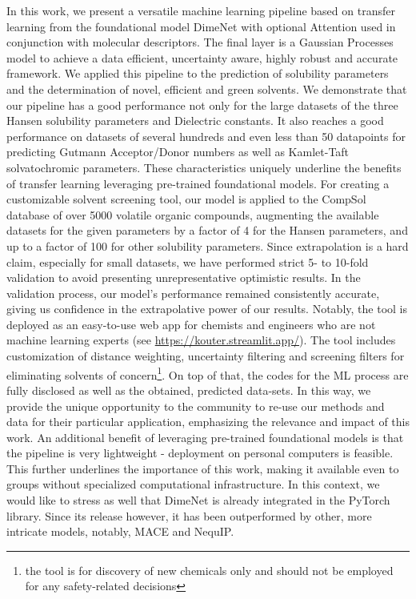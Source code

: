 \documentclass[
  english,        %
  font=times,     %
  onecolumn,      %
]{article}
\begin{document}
In this work, we present a versatile machine learning pipeline based on transfer learning from the foundational model DimeNet with optional Attention used in conjunction with molecular descriptors. The final layer is a Gaussian Processes model to achieve a data efficient, uncertainty aware, highly robust and accurate framework. We applied this pipeline to the prediction of solubility parameters and the determination of novel, efficient and green solvents. We demonstrate that our pipeline has a good performance not only for the large datasets of the three Hansen solubility parameters and Dielectric constants. It also reaches a good performance on datasets of several hundreds and even less than 50 datapoints for predicting Gutmann Acceptor/Donor numbers as well as Kamlet-Taft solvatochromic parameters. These characteristics uniquely underline the benefits  of transfer learning leveraging pre-trained foundational models. For creating a customizable solvent screening tool, our model is applied to the CompSol database of over 5000 volatile organic compounds, augmenting the available datasets for the given parameters by a factor of 4 for the Hansen parameters, and up to a factor of 100 for other solubility parameters. Since extrapolation is a hard claim, especially for small datasets, we have performed strict 5- to 10-fold validation to avoid presenting unrepresentative optimistic results. In the validation process, our model's performance remained consistently accurate, giving us confidence in the extrapolative power of our results.  Notably, the tool is deployed as an easy-to-use web app for chemists and engineers who are not machine learning experts (see \url{https://kouter.streamlit.app/}). The tool includes customization of distance weighting, uncertainty filtering and
screening filters for eliminating solvents of concern\footnote{the tool is for discovery of new chemicals only and should not be employed for any safety-related decisions}.  On top of that, the codes for the ML process are fully disclosed as well as the obtained, predicted data-sets. In this way, we provide the unique opportunity to the community to re-use our methods and data for their particular application, emphasizing the relevance and impact of this work. An additional benefit of leveraging pre-trained foundational models is that the pipeline is very lightweight - deployment on personal computers is feasible. This further underlines the importance of this work, making it available even to groups without specialized computational infrastructure. In this context, we would like to stress as well that DimeNet is already integrated in the PyTorch library. Since its release however, it has been outperformed by other, more intricate models, notably, MACE and NequIP.
\end{document}
